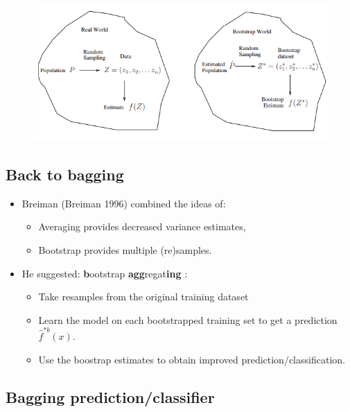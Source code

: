 \documentclass[
  letterpaper,
  DIV=11,
  numbers=noendperiod]{scrartcl}
\providecommand{\tightlist}{%
  \setlength{\itemsep}{0pt}\setlength{\parskip}{0pt}}\usepackage{longtable,booktabs,array}
\begin{document}
\begin{figure}[H]

{\centering \includegraphics[width=1\textwidth,height=\textheight]{images/fromRealWorld2BootstrapWorld.png}

}

\end{figure}

\hypertarget{back-to-bagging}{%
\subsection{Back to bagging}\label{back-to-bagging}}

\begin{itemize}
\tightlist
\item
  Breiman (Breiman 1996) combined the ideas of:

  \begin{itemize}
  \tightlist
  \item
    Averaging provides decreased variance estimates,
  \item
    Bootstrap provides multiple (re)samples.
  \end{itemize}
\item
  He suggested: \textbf{b}ootstrap \textbf{agg}regat\textbf{ing} :

  \begin{itemize}
  \tightlist
  \item
    Take resamples from the original training dataset
  \item
    Learn the model on each bootstrapped training set to get a
    prediction \(\hat f^{*b}(x)\).
  \item
    Use the boostrap estimates to obtain improved
    prediction/classification.
  \end{itemize}
\end{itemize}

\hypertarget{bagging-predictionclassifier}{%
\subsection{Bagging
prediction/classifier}\label{bagging-predictionclassifier}}
\end{document}
